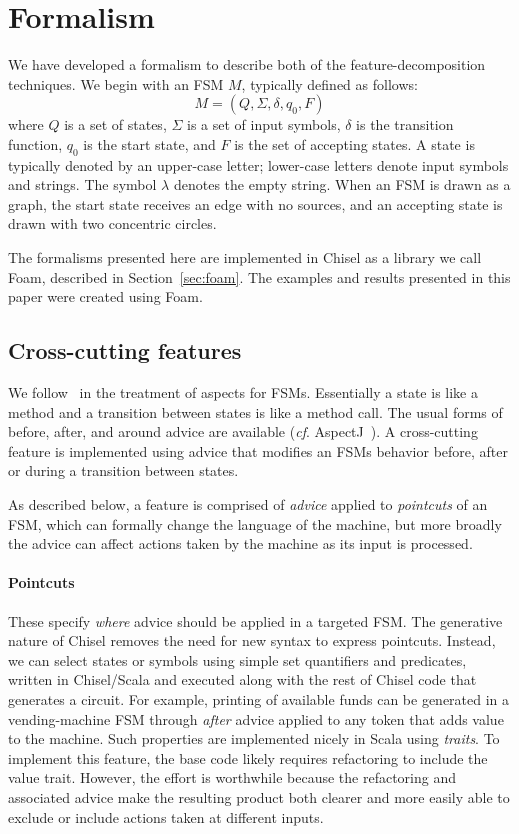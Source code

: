 \documentclass[sigplan,anonymous,review]{acmart}
\begin{document}
\section{Formalism}\label{sec:formal}
We have developed a formalism to describe both of the feature-decomposition techniques. We begin with an FSM $M$, typically defined as follows: 
\[M = (Q, \Sigma, \delta, q_0, F)\]where $Q$ is a set of states, $\Sigma$ is a set of input symbols, $\delta$ is the transition function, $q_0$ is the start state, and $F$ is the set of accepting states.  A state is typically denoted by an upper-case letter;  lower-case letters denote input symbols and strings.  The symbol $\lambda$ denotes the empty string.  When an FSM is drawn as a graph, the start state receives an edge with no sources, and an accepting state is drawn with two concentric circles. 

The formalisms presented here are implemented in Chisel as a library we call Foam, described in Section~\ref{sec:foam}.  The examples and results presented in this paper were created using Foam.  

\subsection{Cross-cutting features}\label{sec:ccut}
We follow~\cite{aspectsUML} in the treatment of aspects for FSMs.  Essentially a state is like a method and a transition between states is like a method call.  The usual forms of before, after, and around advice are available (\textit{cf}. AspectJ~\cite{AspectJ:01}).   A cross-cutting feature is implemented using advice that modifies an FSMs behavior before, after or during a transition between states.

As described below, a feature is comprised of \emph{advice} applied to \emph{pointcuts} of an FSM, which can formally change the language of the machine, but more broadly the advice can affect actions taken by the machine as its input is processed.  

\paragraph{Pointcuts} These specify \emph{where} advice should be applied in a targeted FSM.   The generative nature of Chisel removes the need for new syntax to express pointcuts.  Instead, we can select states or symbols using simple set quantifiers and predicates, written in Chisel/Scala and executed along with the rest of Chisel code that generates a circuit.  For example, printing of available funds can be generated in a vending-machine FSM through \emph{after} advice applied to any token that adds value to the machine.  Such properties are implemented nicely in Scala using \emph{traits}.  To implement this feature, the base code likely requires refactoring to include the value trait.  However, the effort is worthwhile because the refactoring and associated advice make the resulting product both clearer and more easily able to exclude or include actions taken at different inputs.
\end{document}
